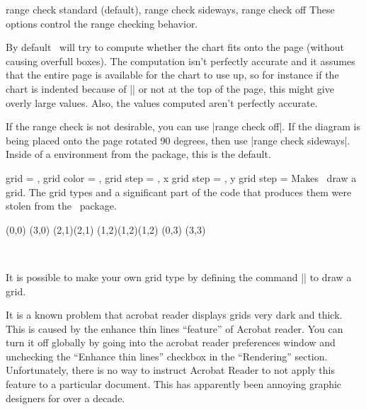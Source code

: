 \begin{sseqdata}[name = basic, cohomological Serre grading]
\begin{keylist}{range check standard (default), range check sideways, range check off}
These options control the range checking behavior.

By default \sseqpages\ will try to compute whether the chart fits onto the page
(without causing overfull boxes). The computation isn't perfectly accurate and
it assumes that the entire page is available for the chart to use up, so for
instance if the chart is indented because of |\textindent| or not at the top of
the page, this might give overly large values. Also, the values computed aren't
perfectly accurate.

If the range check is not desirable, you can use |range check off|. If the
diagram is being placed onto the page rotated 90 degrees, then use
%
|range check sideways|. Inside of a  environment from the
 package, this is the default.
\end{keylist}

\begin{keylist}{
    grid = ,
    grid color = ,
    grid step = ,
    x grid step = ,
    y grid step = 
}%
Makes \sseqpages\  draw a grid. The grid types and a significant part of the
code that produces them were stolen from the \sseqpkg\ package.
\begin{codeexample}[vbox]
\begin{sseqdata}[ name = grid example, scale = 0.8 ]
\class(0,0)
\class(3,0)
\class(2,1)\class(2,1)
\class(1,2)\class(1,2)\class(1,2)
\class(0,3)
\class(3,3)
\end{sseqdata}
\hbox{
\printpage[ name = grid example, grid = chess, title=chess ]
\qquad
\printpage[ name = grid example, grid = crossword, title=crossword ]
}
\vskip20pt
\hbox{
\printpage[ name = grid example, grid = go, title=go ]
\qquad
\printpage[ name = grid example, grid = none ]
}
\end{codeexample}
It is possible to make your own grid type by defining the command
|\sseq@grid@yourgridname| to draw a grid.

It is a known problem that acrobat reader displays grids very dark and thick.
This is caused by the enhance thin lines ``feature'' of Acrobat reader. You can
turn it off globally by going into the acrobat reader preferences window and
unchecking the ``Enhance thin lines'' checkbox in the ``Rendering'' section.
Unfortunately, there is no way to instruct Acrobat Reader to not apply this
feature to a particular document. This has apparently been annoying graphic
designers for over a decade.


\end{keylist}
\end{sseqdata}
